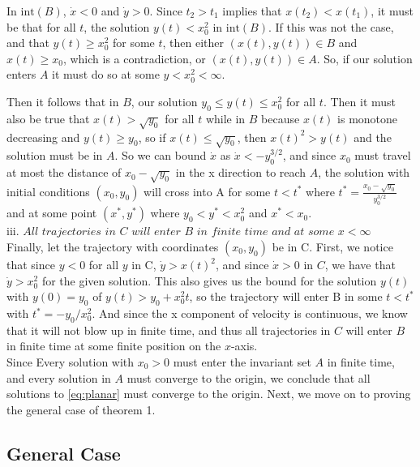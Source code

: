 \documentclass[11pt]{article}
\begin{document}
In $\text{int}(B)$, $\dot{x} < 0$ and $\dot{y} >0$. Since $t_2 > t_1$ implies that $x(t_2) < x(t_1)$, it must be that for all $t$, the solution $y(t) < x_0^2$ in $\text{int}(B)$. If this was not the case, and that $y(t) \geq x_0^2$ for some $t$, then either $(x(t), y(t)) \in B$ and $x(t) \geq x_0$, which is a contradiction, or $(x(t), y(t)) \in A$. So, if our solution enters $A$ it must do so at some $y < x_0^2 < \infty$.

Then it follows that in $B$, our solution $y_0 \leq y(t) \leq x_0^2$ for all $t$. Then it must also be true that $x(t) > \sqrt{y_0}$ for all $t$ while in $B$ because $x(t)$ is monotone decreasing and $y(t) \geq y_0$, so if $x(t) \leq \sqrt{y_0}$, then $x(t)^2 > y(t)$ and the solution must be in $A$. So we can bound $\dot{x}$ as $\dot{x} < -y_0^{3/2}$, and since $x_0$ must travel at most the distance of $x_0 - \sqrt{y_0}$ in the x direction to reach $A$, the solution with initial conditions $(x_0, y_0)$ will cross into A for some $t < t^*$ where $t^* = \frac{x_0 - \sqrt{y_0}}{y_0^{3/2}}$ and at some point $(x^*, y^*)$ where $y_0 < y^* < x_0^2$ and $x^* < x_0$.\\

iii. $\textit{All trajectories in $C$ will enter $B$ in finite time and at some $x < \infty$}$ \\

Finally, let the trajectory with coordinates $(x_0, y_0)$ be in C. First, we notice that since $y < 0$ for all $y$ in C, $\dot{y} > x(t)^2$, and since $\dot{x} > 0$ in $C$, we have that $\dot{y} > x_0^2$ for the given solution. This also gives us the bound for the solution $y(t)$ with $y(0) = y_0$ of $y(t) > y_0 + x_0^2t$, so the trajectory will enter B in some $t < t^*$ with $t^* = -y_0/x_0^2$. And since the x component of velocity is continuous, we know that it will not blow up in finite time, and thus all trajectories in $C$ will enter $B$ in finite time at some finite position on the $x$-axis.\\

Since Every solution with $x_0 > 0$ must enter the invariant set $A$ in finite time, and every solution in $A$ must converge to the origin, we conclude that all solutions to \eqref{eq:planar} must converge to the origin. Next, we move on to proving the general case of theorem 1. 

\subsection{General Case}
\end{document}
